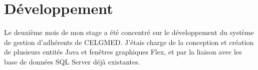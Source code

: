 \section{Développement}

Le deuxième mois de mon stage a été concentré sur le développement du système de gestion d'adhérents de CELGMED. J'étais charge de la conception et création de plusieurs entités Java et fenêtres graphiques Flex, et par la liaison avec les base de données SQL Server déjà existantes.



